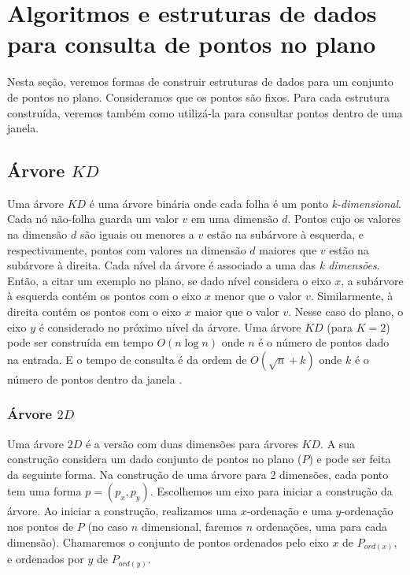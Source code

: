 \chapter{Algoritmos e estruturas de dados para consulta de pontos no plano}\label{cap:desenvolvimento}
Nesta seção, veremos formas de construir estruturas de dados para um conjunto de pontos no plano. Consideramos que os pontos são fixos. Para cada estrutura construída, veremos também como utilizá-la para consultar pontos dentro de uma janela.

\section{Árvore $KD$}

Uma árvore $KD$ \cite{bentley1975multidimensional} é uma árvore binária onde cada folha é um ponto \textit{k-dimensional}.
Cada nó não-folha guarda um valor $v$ em uma dimensão $d$. Pontos cujo os valores na dimensão $d$ são iguais ou menores a $v$ estão na subárvore à esquerda, e respectivamente, pontos com valores na dimensão $d$ maiores que $v$ estão na subárvore à direita. Cada nível da árvore é associado a uma das \textit{k dimensões}. Então, a citar um exemplo no plano,
se dado nível considera o eixo $x$, a subárvore à esquerda contém os pontos com o eixo $x$ menor que o valor $v$. Similarmente, à direita contém os pontos com o eixo $x$ maior que o valor $v$. Nesse caso do plano, o eixo $y$ é considerado no próximo nível da árvore. Uma árvore $KD$ (para $K=2$) pode ser construída em tempo $O(n\log n)$ onde $n$ é o número de pontos dado na entrada. E o tempo de consulta é da ordem de $O(\sqrt{n}+k)$ onde $k$ é o número de pontos dentro da janela \cite{cg08}. %

\subsection{Árvore $2D$}
Uma árvore $2D$ é a versão com duas dimensões para árvores $KD$. A sua construção considera um dado conjunto de pontos no plano ($P$) e pode ser feita da seguinte forma. Na construção de uma árvore para 2 dimensões, cada ponto tem uma forma $p = (p_x, p_y)$. Escolhemos um eixo para iniciar a construção da árvore. Ao iniciar a construção, realizamos     uma $x$-ordenação e uma $y$-ordenação nos pontos de $P$ (no caso $n$ dimensional, faremos $n$ ordenações, uma para cada dimensão). Chamaremos o conjunto de pontos ordenados pelo eixo $x$ de $P_{ord(x)}$, e ordenados por $y$ de $P_{ord(y)}$.

